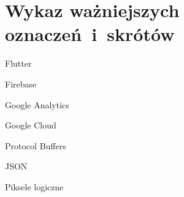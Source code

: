 \chapter*{Wykaz ważniejszych oznaczeń~i~skrótów}

\begin{description}
	\item Flutter
	\item Firebase
	\item Google Analytics
	\item Google Cloud
	\item Protocol Buffers
	\item JSON
	\item Piksele logiczne
\end{description}
